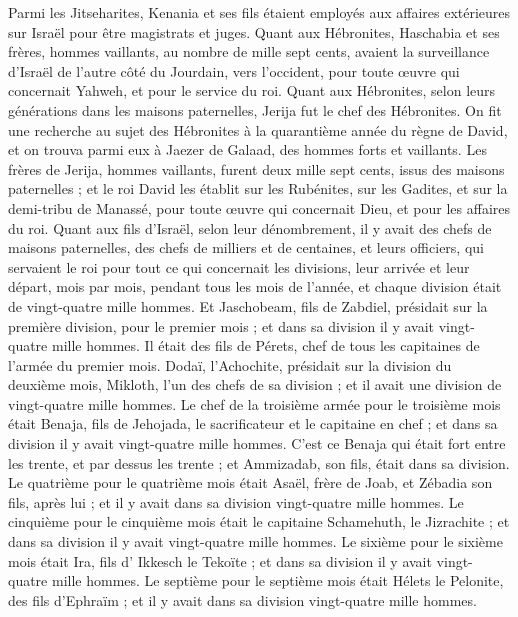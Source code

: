 \begin{multicols}{2}
Parmi les Jitseharites, Kenania et ses fils étaient employés aux affaires extérieures sur Israël pour être magistrats et juges.
Quant aux Hébronites, Haschabia et ses frères, hommes vaillants, au nombre de mille sept cents, avaient la surveillance d'Israël de l'autre côté du Jourdain, vers l'occident, pour toute œuvre qui concernait Yahweh, et pour le service du roi.
Quant aux Hébronites, selon leurs générations dans les maisons paternelles, Jerija fut le chef des Hébronites. On fit une recherche au sujet des Hébronites à la quarantième année du règne de David, et on trouva parmi eux à Jaezer de Galaad, des hommes forts et vaillants.
Les frères de Jerija, hommes vaillants, furent deux mille sept cents, issus des maisons paternelles ; et le roi David les établit sur les Rubénites, sur les Gadites, et sur la demi-tribu de Manassé, pour toute œuvre qui concernait Dieu, et pour les affaires du roi.
\VerseOne{}Quant aux fils d'Israël, selon leur dénombrement, il y avait des chefs de maisons paternelles, des chefs de milliers et de centaines, et leurs officiers, qui servaient le roi pour tout ce qui concernait les divisions, leur arrivée et leur départ, mois par mois, pendant tous les mois de l'année, et chaque division était de vingt-quatre mille hommes.
Et Jaschobeam, fils de Zabdiel, présidait sur la première division, pour le premier mois ; et dans sa division il y avait vingt-quatre mille hommes.
Il était des fils de Pérets, chef de tous les capitaines de l'armée du premier mois.
Dodaï, l'Achochite, présidait sur la division du deuxième mois, Mikloth, l'un des chefs de sa division ; et il avait une division de vingt-quatre mille hommes.
Le chef de la troisième armée pour le troisième mois était Benaja, fils de Jehojada, le sacrificateur et le capitaine en chef ; et dans sa division il y avait vingt-quatre mille hommes.
C'est ce Benaja qui était fort entre les trente, et par dessus les trente ; et Ammizadab, son fils, était dans sa division.
Le quatrième pour le quatrième mois était Asaël, frère de Joab, et Zébadia son fils, après lui ; et il y avait dans sa division vingt-quatre mille hommes.
Le cinquième pour le cinquième mois était le capitaine Schamehuth, le Jizrachite ; et dans sa division il y avait vingt-quatre mille hommes.
Le sixième pour le sixième mois était Ira, fils d' Ikkesch le Tekoïte ; et dans sa division il y avait vingt-quatre mille hommes.
Le septième pour le septième mois était Hélets le Pelonite, des fils d'Ephraïm ; et il y avait dans sa division vingt-quatre mille hommes.

\end{multicols}
